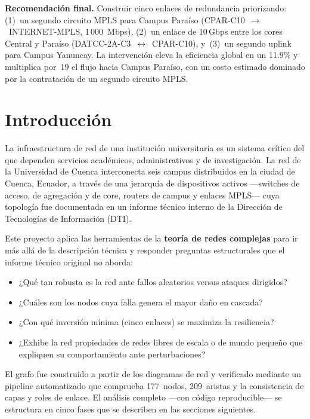 \documentclass[12pt, a4paper]{article}
\newenvironment{resumen}{%
    \begin{mdframed}[backgroundcolor=grisfondo, linecolor=borde,
        linewidth=4pt, leftline=true, rightline=false,
        topline=false, bottomline=false,
        innerleftmargin=10pt, innerrightmargin=10pt,
        innertopmargin=8pt, innerbottommargin=8pt,
        leftmargin=0pt, rightmargin=0pt,
        skipabove=10pt, skipbelow=10pt]
    \small
}{\end{mdframed}}
\begin{document}
\begin{resumen}
\medskip
\textbf{Recomendación final.} Construir cinco enlaces de redundancia
priorizando: (1)~un segundo circuito MPLS para Campus Paraíso
(CPAR-C10~$\to$~INTERNET-MPLS, 1\,000~Mbps), (2)~un enlace de 10\,Gbps entre
los cores Central y Paraíso (DATCC-2A-C3~$\leftrightarrow$~CPAR-C10),
y~(3)~un segundo uplink para Campus Yanuncay. La intervención eleva la
eficiencia global en un 11.9\% y multiplica por~19 el flujo hacia Campus
Paraíso, con un costo estimado dominado por la contratación de un segundo
circuito MPLS.
\end{resumen}

\newpage
\tableofcontents
\newpage

\section{Introducción}

La infraestructura de red de una institución universitaria es un sistema crítico
del que dependen servicios académicos, administrativos y de investigación. La
red de la Universidad de Cuenca interconecta seis campus distribuidos en la
ciudad de Cuenca, Ecuador, a través de una jerarquía de dispositivos activos
---switches de acceso, de agregación y de core, routers de campus y enlaces
MPLS--- cuya topología fue documentada en un informe técnico interno de la
Dirección de Tecnologías de Información (DTI).

Este proyecto aplica las herramientas de la \textbf{teoría de redes complejas}
para ir más allá de la descripción técnica y responder preguntas estructurales
que el informe técnico original no aborda:

\begin{itemize}
    \item ¿Qué tan robusta es la red ante fallos aleatorios versus ataques
          dirigidos?
    \item ¿Cuáles son los nodos cuya falla genera el mayor daño en cascada?
    \item ¿Con qué inversión mínima (cinco enlaces) se maximiza la
          resiliencia?
    \item ¿Exhibe la red propiedades de redes libres de escala o de mundo
          pequeño que expliquen su comportamiento ante perturbaciones?
\end{itemize}

El grafo fue construido a partir de los diagramas de red y verificado mediante
un pipeline automatizado que comprueba 177~nodos, 209~aristas y la consistencia
de capas y roles de enlace. El análisis completo ---con código reproducible---
se estructura en cinco fases que se describen en las secciones siguientes.
\end{document}
